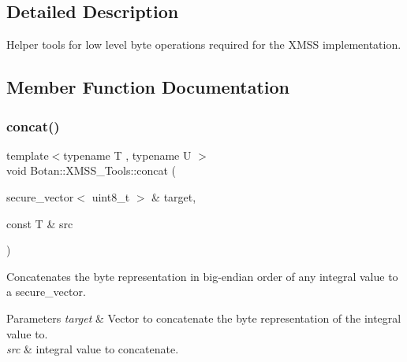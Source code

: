 \subsection{Detailed Description}
Helper tools for low level byte operations required for the X\+M\+SS implementation. 

\subsection{Member Function Documentation}
\mbox{\label{class_botan_1_1_x_m_s_s___tools_add86e0bedfc6b9995c4d04dbe1ac8a2d}} 
\subsubsection{\texorpdfstring{concat()}{concat()}\hspace{0.1cm}{\footnotesize\ttfamily [1/2]}}
{\footnotesize\ttfamily template$<$typename T , typename U $>$ \\
void Botan\+::\+X\+M\+S\+S\+\_\+\+Tools\+::concat (\begin{DoxyParamCaption}\item[{secure\+\_\+vector$<$ uint8\+\_\+t $>$ \&}]{target,  }\item[{const T \&}]{src }\end{DoxyParamCaption})\hspace{0.3cm}{\ttfamily [static]}}

Concatenates the byte representation in big-\/endian order of any integral value to a secure\+\_\+vector.


\begin{DoxyParams}{Parameters}
{\em target} & Vector to concatenate the byte representation of the integral value to. \\
\hline
{\em src} & integral value to concatenate. \\
\hline
\end{DoxyParams}
\mbox{\label{class_botan_1_1_x_m_s_s___tools_abe515ea4b81739fc09a6ca36c0487917}} 
